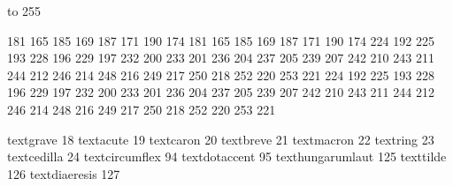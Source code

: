 

\startmapping[il2]

 to 255    %

 181 165    185 169
 187 171    190 174
 181 165    185 169
 187 171    190 174
 224 192    225 193
 228 196    229 197
 232 200    233 201
 236 204    237 205
 239 207    242 210
 243 211    244 212
 246 214    248 216
 249 217    250 218
 252 220    253 221
 224 192    225 193
 228 196    229 197
 232 200    233 201
 236 204    237 205
 239 207    242 210
 243 211    244 212
 246 214    248 216
 249 217    250 218
 252 220    253 221

\stopmapping

\startcoding[il2][il2]

 textgrave          18
 textacute          19
 textcaron          20
 textbreve          21
 textmacron         22
 textring           23
 textcedilla        24
 textcircumflex     94
 textdotaccent      95
 texthungarumlaut  125
 texttilde         126
 textdiaeresis     127

